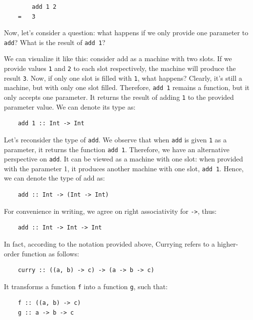 \begin{lstlisting}
        add 1 2
    =   3
\end{lstlisting}

Now, let's consider a question: what happens if we only provide one parameter to \texttt{add}? What is the result of \texttt{add 1}?

We can visualize it like this: consider add as a machine with two slots. If we provide values \texttt{1} and \texttt{2} to each slot respectively, the machine will produce the result \texttt{3}. Now, if only one slot is filled with \texttt{1}, what happens? Clearly, it's still a machine, but with only one slot filled. Therefore, \texttt{add 1} remains a function, but it only accepts one parameter. It returns the result of adding \texttt{1} to the provided parameter value. We can denote its type as:
\begin{lstlisting}
    add 1 :: Int -> Int
\end{lstlisting}

Let's reconsider the type of \texttt{add}. We observe that when \texttt{add} is given \texttt{1} as a parameter, it returns the function \texttt{add 1}. Therefore, we have an alternative perspective on \texttt{add}. It can be viewed as a machine with one slot: when provided with the parameter 1, it produces another machine with one slot, \texttt{add 1}. Hence, we can denote the type of add as:

\begin{lstlisting}
    add :: Int -> (Int -> Int)
\end{lstlisting}

For convenience in writing, we agree on right associativity for \texttt{->}, thus:

\begin{lstlisting}
    add :: Int -> Int -> Int
\end{lstlisting}

In fact, according to the notation provided above, Currying refers to a higher-order function as follows:

\begin{lstlisting}
    curry :: ((a, b) -> c) -> (a -> b -> c)
\end{lstlisting}

\noindent It transforms a function \texttt{f} into a function \texttt{g}, such that:
\begin{lstlisting}
    f :: ((a, b) -> c)
    g :: a -> b -> c
\end{lstlisting}

